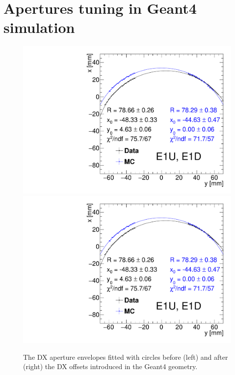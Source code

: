 
\chapter{Apertures tuning in Geant4 simulation}\label{appendix:g4ApertureTuning}

\begin{figure}[hb]\centering%
\caption{The DX aperture envelopes fitted with circles before (left) and after (right) the DX offsets introduced in the Geant4 geometry.}\label{fig:aperturesWithFit}%
\parbox{0.495\textwidth}{
  \centering
  \includegraphics[width=\linewidth,page=1]{graphics/rpSim/Apertures_swapedAxes_withFit_beforeDxShift.pdf}\\[10pt]
  \includegraphics[width=\linewidth,page=2]{graphics/rpSim/Apertures_swapedAxes_withFit_beforeDxShift.pdf}
}
\end{figure}

